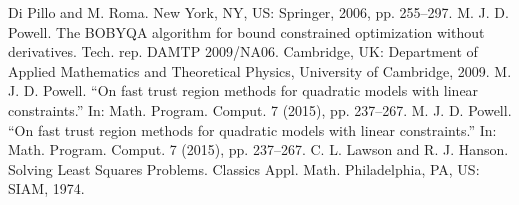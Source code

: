 \documentclass[letterpaper,10pt,english]{sphinxmanual}
\begin{document}
\begin{sphinxthebibliography}{1}
Di Pillo and M. Roma. New York, NY, US: Springer, 2006, pp. 255\sphinxhyphen{}–297.
\sphinxAtStartPar
M. J. D. Powell. The BOBYQA algorithm for bound constrained
optimization without derivatives. Tech. rep. DAMTP 2009/NA06. Cambridge,
UK: Department of Applied Mathematics and Theoretical Physics, University
of Cambridge, 2009.
\sphinxAtStartPar
M. J. D. Powell. “On fast trust region methods for quadratic models
with linear constraints.” In: Math. Program. Comput. 7 (2015), pp.
237–\sphinxhyphen{}267.
\sphinxAtStartPar
M. J. D. Powell. “On fast trust region methods for quadratic models
with linear constraints.” In: Math. Program. Comput. 7 (2015), pp.
237–267.
\sphinxAtStartPar
C. L. Lawson and R. J. Hanson. Solving Least Squares Problems.
Classics Appl. Math. Philadelphia, PA, US: SIAM, 1974.
\end{sphinxthebibliography}



\renewcommand{\indexname}{Index}
\printindex
\end{document}
